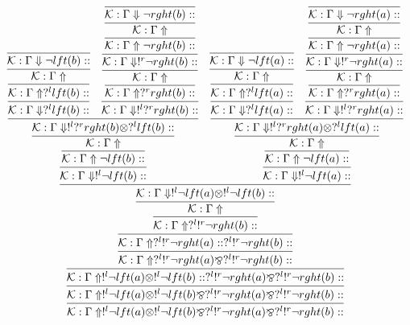 \documentclass[a4paper, 11pt]{article}
\begin{document}
{\tiny
$$
\infer{\mathcal{K} : \Gamma \Uparrow  !^{l} \neg lft (a)  \otimes  !^{l} \neg lft (b)  \bindnasrepma  ?^{l}  !^{r} \neg rght (a)  \bindnasrepma  ?^{l}  !^{r} \neg rght (b)  :: }
{\infer{\mathcal{K} : \Gamma \Uparrow  !^{l} \neg lft (a)  \otimes  !^{l} \neg lft (b)  \bindnasrepma  ?^{l}  !^{r} \neg rght (a)  \bindnasrepma  ?^{l}  !^{r} \neg rght (b)  :: }
{\infer{\mathcal{K} : \Gamma \Uparrow  !^{l} \neg lft (a)  \otimes  !^{l} \neg lft (b)  ::  ?^{l}  !^{r} \neg rght (a)  \bindnasrepma  ?^{l}  !^{r} \neg rght (b)  :: }
{\infer{\mathcal{K} : \Gamma \Uparrow  ?^{l}  !^{r} \neg rght (a)  \bindnasrepma  ?^{l}  !^{r} \neg rght (b)  :: }
{\infer{\mathcal{K} : \Gamma \Uparrow  ?^{l}  !^{r} \neg rght (a)  ::  ?^{l}  !^{r} \neg rght (b)  :: }
{\infer{\mathcal{K} : \Gamma \Uparrow  ?^{l}  !^{r} \neg rght (b)  :: }
{\infer{\mathcal{K} : \Gamma \Uparrow }
{\infer{\mathcal{K} : \Gamma \Downarrow  !^{l} \neg lft (a)  \otimes  !^{l} \neg lft (b)  :: }
{\infer{\mathcal{K} : \Gamma \Downarrow  !^{l} \neg lft (b)  :: }
{\infer{\mathcal{K} : \Gamma \Uparrow \neg lft (b)  :: }
{\infer{\mathcal{K} : \Gamma \Uparrow }
{\infer{\mathcal{K} : \Gamma \Downarrow  !^{l}  ?^{r} rght (b)  \otimes  ?^{l} lft (b)  :: }
{\infer{\mathcal{K} : \Gamma \Downarrow  ?^{l} lft (b)  :: }
{\infer{\mathcal{K} : \Gamma \Uparrow  ?^{l} lft (b)  :: }
{\infer{\mathcal{K} : \Gamma \Uparrow }
{\infer{\mathcal{K} : \Gamma \Downarrow \neg lft (b)  :: }
{}}}} & \infer{\mathcal{K} : \Gamma \Downarrow  !^{l}  ?^{r} rght (b)  :: }
{\infer{\mathcal{K} : \Gamma \Uparrow  ?^{r} rght (b)  :: }
{\infer{\mathcal{K} : \Gamma \Uparrow }
{\infer{\mathcal{K} : \Gamma \Downarrow  !^{r} \neg rght (b)  :: }
{\infer{\mathcal{K} : \Gamma \Uparrow \neg rght (b)  :: }
{\infer{\mathcal{K} : \Gamma \Uparrow }
{\infer{\mathcal{K} : \Gamma \Downarrow \neg rght (b)  :: }
{}}}}}}}}}}} & \infer{\mathcal{K} : \Gamma \Downarrow  !^{l} \neg lft (a)  :: }
{\infer{\mathcal{K} : \Gamma \Uparrow \neg lft (a)  :: }
{\infer{\mathcal{K} : \Gamma \Uparrow }
{\infer{\mathcal{K} : \Gamma \Downarrow  !^{l}  ?^{r} rght (a)  \otimes  ?^{l} lft (a)  :: }
{\infer{\mathcal{K} : \Gamma \Downarrow  ?^{l} lft (a)  :: }
{\infer{\mathcal{K} : \Gamma \Uparrow  ?^{l} lft (a)  :: }
{\infer{\mathcal{K} : \Gamma \Uparrow }
{\infer{\mathcal{K} : \Gamma \Downarrow \neg lft (a)  :: }
{}}}} & \infer{\mathcal{K} : \Gamma \Downarrow  !^{l}  ?^{r} rght (a)  :: }
{\infer{\mathcal{K} : \Gamma \Uparrow  ?^{r} rght (a)  :: }
{\infer{\mathcal{K} : \Gamma \Uparrow }
{\infer{\mathcal{K} : \Gamma \Downarrow  !^{r} \neg rght (a)  :: }
{\infer{\mathcal{K} : \Gamma \Uparrow \neg rght (a)  :: }
{\infer{\mathcal{K} : \Gamma \Uparrow }
{\infer{\mathcal{K} : \Gamma \Downarrow \neg rght (a)  :: }
{}}}}}}}}}}}}}}}}}}}$$
}
\end{document}
